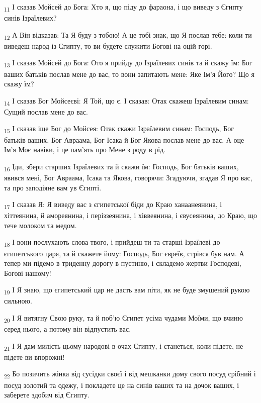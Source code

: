\begin{tcolorbox}
\textsubscript{11} І сказав Мойсей до Бога: Хто я, що піду до фараона, і що виведу з Єгипту синів Ізраїлевих?
\end{tcolorbox}
\begin{tcolorbox}
\textsubscript{12} А Він відказав: Та Я буду з тобою! А це тобі знак, що Я послав тебе: коли ти виведеш народ із Єгипту, то ви будете служити Богові на оцій горі.
\end{tcolorbox}
\begin{tcolorbox}
\textsubscript{13} І сказав Мойсей до Бога: Ото я прийду до Ізраїлевих синів та й скажу їм: Бог ваших батьків послав мене до вас, то вони запитають мене: Яке Ім'я Його? Що я скажу їм?
\end{tcolorbox}
\begin{tcolorbox}
\textsubscript{14} І сказав Бог Мойсеєві: Я Той, що є. І сказав: Отак скажеш Ізраїлевим синам: Сущий послав мене до вас.
\end{tcolorbox}
\begin{tcolorbox}
\textsubscript{15} І сказав іще Бог до Мойсея: Отак скажи Ізраїлевим синам: Господь, Бог батьків ваших, Бог Авраама, Бог Ісака й Бог Якова послав мене до вас. А оце Ім'я Моє навіки, і це пам'ять про Мене з роду в рід.
\end{tcolorbox}
\begin{tcolorbox}
\textsubscript{16} Іди, збери старших Ізраїлевих та й скажи їм: Господь, Бог батьків ваших, явився мені, Бог Авраама, Ісака та Якова, говорячи: Згадуючи, згадав Я про вас, та про заподіяне вам ув Єгипті.
\end{tcolorbox}
\begin{tcolorbox}
\textsubscript{17} І сказав Я: Я виведу вас з єгипетської біди до Краю ханаанеянина, і хіттеянина, й амореянина, і періззеянина, і хіввеянина, і євусеянина, до Краю, що тече молоком та медом.
\end{tcolorbox}
\begin{tcolorbox}
\textsubscript{18} І вони послухають слова твого, і прийдеш ти та старші Ізраїлеві до єгипетського царя, та й скажете йому: Господь, Бог євреїв, стрівся був нам. А тепер ми підемо в триденну дорогу в пустиню, і складемо жертви Господеві, Богові нашому!
\end{tcolorbox}
\begin{tcolorbox}
\textsubscript{19} І Я знаю, що єгипетський цар не дасть вам піти, як не буде змушений рукою сильною.
\end{tcolorbox}
\begin{tcolorbox}
\textsubscript{20} І Я витягну Свою руку, та й поб'ю Єгипет усіма чудами Моїми, що вчиню серед нього, а потому він відпустить вас.
\end{tcolorbox}
\begin{tcolorbox}
\textsubscript{21} І Я дам милість цьому народові в очах Єгипту, і станеться, коли підете, не підете ви впорожні!
\end{tcolorbox}
\begin{tcolorbox}
\textsubscript{22} Бо позичить жінка від сусідки своєї і від мешканки дому свого посуд срібний і посуд золотий та одежу, і покладете це на синів ваших та на дочок ваших, і заберете здобич від Єгипту.
\end{tcolorbox}
